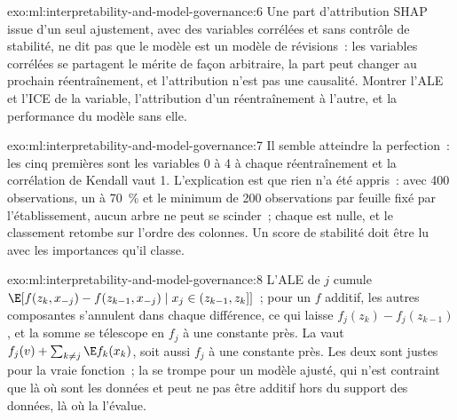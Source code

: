 \begin{solution}{exo:ml:interpretability-and-model-governance:6}
Une part d'attribution SHAP issue d'un seul ajustement, avec des variables corrélées et sans contrôle de stabilité, ne dit pas que le modèle est un
modèle de révisions~: les variables corrélées se partagent le mérite de façon arbitraire, la part peut changer au prochain réentraînement, et l'attribution n'est pas
une causalité. Montrer l'ALE et l'ICE de la variable, l'attribution d'un réentraînement à l'autre, et la performance du modèle sans elle.
\end{solution}

\begin{solution}{exo:ml:interpretability-and-model-governance:7}
Il semble atteindre la perfection~: les cinq premières sont les variables 0 à 4 à chaque réentraînement et la corrélation de Kendall vaut 1.
L'explication est que rien n'a été appris~: avec 400 observations, un  à 70~\% et le minimum de 200 observations par
feuille fixé par l'établissement, aucun arbre ne peut se scinder~; chaque  est nulle, et le classement retombe sur l'ordre des colonnes. Un score de stabilité doit être lu
avec les importances qu'il classe.
\end{solution}

\begin{solution}{exo:ml:interpretability-and-model-governance:8}
L'ALE de $j$ cumule $\E[f(z_{k}, x_{-j}) - f(z_{k-1}, x_{-j})\mid x_j\in(z_{k-1}, z_k]]$~; pour un $f$ additif, les autres
composantes s'annulent dans chaque différence, ce qui laisse $f_j(z_k) - f_j(z_{k-1})$, et la somme se télescope en $f_j$ à une constante près.
La  vaut $f_j(v) + \sum_{k\ne j}\E f_k(x_k)$, soit aussi $f_j$ à une constante près. Les deux sont justes pour la vraie
fonction~; la  se trompe pour un modèle ajusté, qui n'est contraint que là où sont les données et peut ne pas être
additif hors du support des données, là où la  l'évalue.
\end{solution}

